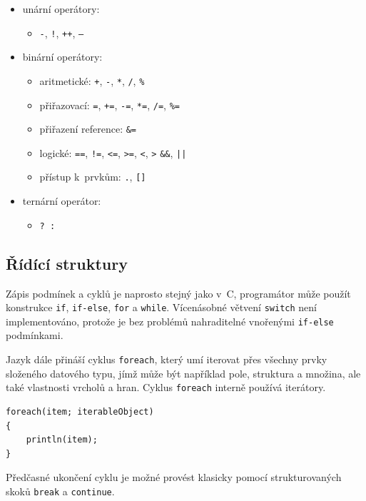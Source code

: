 \documentclass[11pt,twoside,a4paper]{book}
\begin{document}
\begin{itemize}
\item unární operátory:
	\begin{itemize}
	\item \texttt{-}, \texttt{!}, \texttt{++}, \texttt{--}
	\end{itemize}
\item binární operátory:
	\begin{itemize}
	\item aritmetické: \texttt{+}, \texttt{-}, \texttt{*}, \texttt{/}, \texttt{\%}
	\item přiřazovací: \texttt{=}, \texttt{+=}, \texttt{-=}, \texttt{*=}, \texttt{/=}, \texttt{\%=}
	\item přiřazení reference: \texttt{\&=}
	\item logické: \texttt{==}, \texttt{!=}, \texttt{<=}, \texttt{>=}, \texttt{<}, \texttt{>} \texttt{\&\&}, \texttt{||}
	\item přístup k~prvkům: \texttt{.}, \texttt{[]}
	\end{itemize}
\item ternární operátor:
	\begin{itemize}
	\item \texttt{? :}
	\end{itemize}
\end{itemize}


\subsection{Řídící struktury}

Zápis podmínek a cyklů je naprosto stejný jako v~C, programátor může použít konstrukce \texttt{if}, \texttt{if-else}, \texttt{for} a \texttt{while}. Vícenásobné větvení \texttt{switch} není implementováno, protože je bez problémů nahraditelné vnořenými \texttt{if-else} podmínkami.

Jazyk dále přináší cyklus \texttt{foreach}, který umí iterovat přes všechny prvky složeného datového typu, jímž může být například pole, struktura a množina, ale také vlastnosti vrcholů a hran. Cyklus \texttt{foreach} interně používá iterátory.

\begin{verbatim}
foreach(item; iterableObject)
{
    println(item);
}
\end{verbatim}

Předčasné ukončení cyklu je možné provést klasicky pomocí strukturovaných skoků \texttt{break} a \texttt{continue}.
\end{document}
